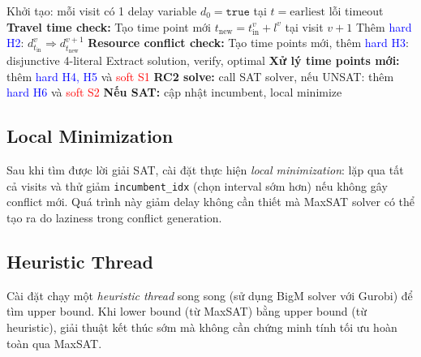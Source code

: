 \documentclass[11pt,a4paper]{article}
\begin{document}
\begin{algorithm}[H]
\caption{DDD-TRP Main Loop (Ladder encoding variant)}
\begin{algorithmic}[1]
\State Khởi tạo: mỗi visit có 1 delay variable $d_0 = \texttt{true}$ tại $t = \text{earliest}$
\Loop
   \Return lỗi timeout \EndIf
      \State \textbf{Travel time check:}
        \State Tạo time point mới $t_\text{new} = t_\text{in}^v + l^v$ tại visit $v+1$
        \State Thêm \textcolor{blue}{hard H2}: $d_{t_\text{in}}^v \Rightarrow d_{t_\text{new}}^{v+1}$
      \EndIf
      \State \textbf{Resource conflict check:}
          \State Tạo time points mới, thêm \textcolor{blue}{hard H3}: disjunctive 4-literal
        \EndIf
      \EndFor
    \EndFor
      \State Extract solution, verify, \Return optimal
    \EndIf
  \EndIf
  \State \textbf{Xử lý time points mới:} thêm \textcolor{blue}{hard H4, H5} và \textcolor{red}{soft S1}
  \State \textbf{RC2 solve:} call SAT solver, nếu UNSAT: thêm \textcolor{blue}{hard H6} và \textcolor{red}{soft S2}
  \State \textbf{Nếu SAT:} cập nhật incumbent, local minimize
\EndLoop
\end{algorithmic}
\end{algorithm}

\subsection{Local Minimization}

Sau khi tìm được lời giải SAT, cài đặt thực hiện \emph{local minimization}: lặp qua tất cả visits và thử giảm \texttt{incumbent\_idx} (chọn interval sớm hơn) nếu không gây conflict mới. Quá trình này giảm delay không cần thiết mà MaxSAT solver có thể tạo ra do laziness trong conflict generation.

\subsection{Heuristic Thread}

Cài đặt chạy một \emph{heuristic thread} song song (sử dụng BigM solver với Gurobi) để tìm upper bound. Khi lower bound (từ MaxSAT) bằng upper bound (từ heuristic), giải thuật kết thúc sớm mà không cần chứng minh tính tối ưu hoàn toàn qua MaxSAT.
\end{document}
